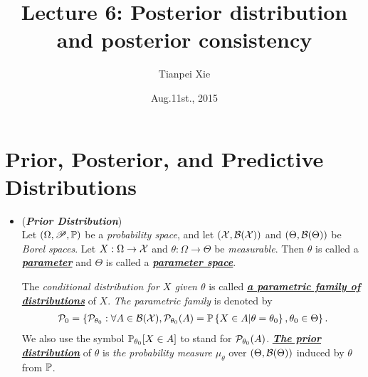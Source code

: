 \documentclass[11pt]{article}
\begin{document}
\title{Lecture 6: Posterior distribution and posterior consistency}
\author{ Tianpei Xie}
\date{ Aug.11st., 2015 }
\maketitle
\tableofcontents
\newpage
\section{Prior, Posterior, and Predictive Distributions}
\begin{itemize}
\item \begin{definition}  (\emph{\textbf{Prior Distribution}}) \citep{ghosh2003bayesian, schervish2012theory}\\
Let $(\Omega, {\mathscr P}, {\mathbb P})$ be a \emph{probability space}, and let $({\mathcal X}, {\mathcal B}({\mathcal X}))$ and $(\Theta, {\mathcal B}(\Theta))$ be \emph{Borel spaces}. Let $X: \Omega \to {\mathcal X}$ and $\theta: \Omega \to \Theta$ be \emph{measurable}. Then $\theta$ is called a \underline{\emph{\textbf{parameter}}} and $\Theta$ is called a \underline{\emph{\textbf{parameter space}}}. 

The \emph{conditional distribution for $X$ given $\theta$} is called \underline{\emph{\textbf{a parametric family of distributions}}} of $X$. \emph{The parametric family} is denoted by
\begin{align*}
{\mathcal P}_{0} = \left\{{\mathcal P}_{\theta_0}: \forall A \in {\mathcal B}({\mathcal X}),  {\mathcal P}_{\theta_0}(A) = {\mathbb P}\left\{X \in A | \theta = \theta_0 \right\}, \theta_0 \in \Theta \right\}.
\end{align*}
We also use the symbol ${\mathbb P}_{\theta_0}[X \in A]$ to stand for ${\mathcal P}_{\theta_0}(A)$. \underline{\emph{\textbf{The prior distribution}}} of $\theta$ is \emph{the probability measure} $\mu_{\theta}$ over $(\Theta, {\mathcal B}(\Theta))$ induced by $\theta$ from ${\mathbb P}$.
%
%
\end{definition}


\end{itemize}
\end{document}
